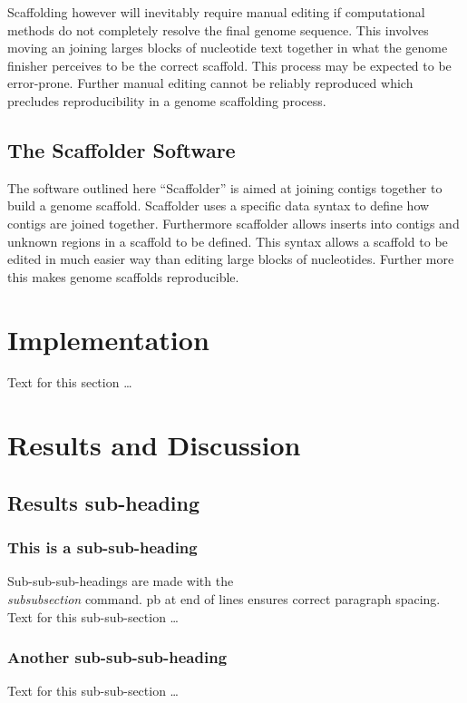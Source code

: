 \documentclass[10pt]{bmc_article}
\newenvironment{bmcformat}{\begin{raggedright}\baselineskip20pt\sloppy\setboolean{publ}{false}}{\end{raggedright}\baselineskip20pt\sloppy}
\begin{document}
\begin{bmcformat}
Scaffolding however will inevitably require manual editing if computational
methods do not completely resolve the final genome sequence. This involves
moving an joining larges blocks of nucleotide text together in what the genome
finisher perceives to be the correct scaffold. This process may be expected to
be error-prone. Further manual editing cannot be reliably reproduced which
precludes reproducibility in a genome scaffolding process. \pb

\subsection*{The Scaffolder Software} %

The software outlined here ``Scaffolder'' is aimed at joining contigs together
to build a genome scaffold. Scaffolder uses a specific data syntax to define
how contigs are joined together. Furthermore scaffolder allows inserts into
contigs and unknown regions in a scaffold to be defined. This syntax allows
a scaffold to be edited in much easier way than editing large blocks of
nucleotides. Further more this makes genome scaffolds reproducible.

\section*{Implementation} %

  Text for this section \ldots
 
\section*{Results and Discussion}
  \subsection*{Results sub-heading}
    \subsubsection*{This is a sub-sub-heading}
      Sub-sub-sub-headings are made with the \textsl{\\subsubsection} command. \pb
      pb at end of lines ensures correct paragraph spacing.\pb
	  Text for this sub-sub-section \ldots
    \subsubsection*{Another sub-sub-sub-heading}
      Text for this sub-sub-section \ldots


\end{bmcformat}
\end{document}
